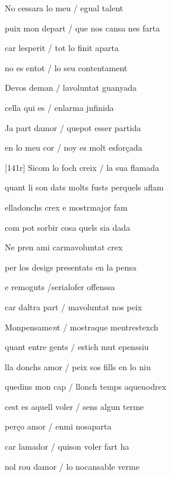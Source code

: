 \documentclass[12pt]{article}
\begin{document}
\begin{estrofa}

 No cessara lo meu / egual talent

 puix mon depart / que nos cansa nes farta

 car lesperit / tot lo finit aparta

 no es entot / lo seu contentament

 Devos deman / lavoluntat guanyada

 cella qui es / enlarma jnfinida

 Ja part damor / quepot esser partida

 en lo meu cor / noy es molt esfor\c{c}ada

\end{estrofa}



\begin{estrofa}

 [141r] Sicom lo foch creix / la sua flamada

 quant li son dats molts fusts perquels aflam

 elladonchs crex e mostrmajor fam

 com pot sorbir cosa quels sia dada

 Ne pren ami carmavoluntat crex

 per los desigs presentats en la pensa

 e remoguts /serialofer offenssa

 car daltra part / mavoluntat nos peix

\end{estrofa}



\begin{estrofa}

 Monpensame\textit{n}t / mostraque mentrestexch

 quant entre gents / estich mut epenssiu

 lla donchs amor / peix sos fills en lo niu

 quedins mon cap / llonch temps aquenodrex

 cest es aquell voler / sens algun terme

 per\c{c}o amor / enmi nosaparta

 car lamador / quison voler fart ha

 nol rou damor / lo nocansable verme

\end{estrofa}
\end{document}
